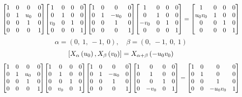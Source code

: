 \documentclass[11pt]{article}
\theoremstyle{definition}
\begin{document}
\[
\scaletoalign{\textwidth}{{\left[\begin{matrix}1 & 0 & 0 & 0\\0 & 1 & u_{0} & 0\\0 & 0 & 1 & 0\\0 & 0 & 0 & 1\end{matrix}\right]} {\left[\begin{matrix}1 & 0 & 0 & 0\\0 & 1 & 0 & 0\\v_{0} & 0 & 1 & 0\\0 & 0 & 0 & 1\end{matrix}\right]} {\left[\begin{matrix}1 & 0 & 0 & 0\\0 & 1 & - u_{0} & 0\\0 & 0 & 1 & 0\\0 & 0 & 0 & 1\end{matrix}\right]} {\left[\begin{matrix}1 & 0 & 0 & 0\\0 & 1 & 0 & 0\\- v_{0} & 0 & 1 & 0\\0 & 0 & 0 & 1\end{matrix}\right]} = {\left[\begin{matrix}1 & 0 & 0 & 0\\u_{0} v_{0} & 1 & 0 & 0\\0 & 0 & 1 & 0\\0 & 0 & 0 & 1\end{matrix}\right]}}
\]
\[
\alpha = \left( 0, \  1, \  -1, \  0\right), \quad \beta = \left( 0, \  -1, \  0, \  1\right)
\]
\[
\scaletoalign{\textwidth}{\left[ X_{\alpha}\left(u_{0}\right), X_{\beta}\left(v_{0}\right) \right] = X_{\alpha + \beta}\left(- u_{0} v_{0}\right)}
\]
\[
\scaletoalign{\textwidth}{{\left[\begin{matrix}1 & 0 & 0 & 0\\0 & 1 & u_{0} & 0\\0 & 0 & 1 & 0\\0 & 0 & 0 & 1\end{matrix}\right]} {\left[\begin{matrix}1 & 0 & 0 & 0\\0 & 1 & 0 & 0\\0 & 0 & 1 & 0\\0 & v_{0} & 0 & 1\end{matrix}\right]} {\left[\begin{matrix}1 & 0 & 0 & 0\\0 & 1 & - u_{0} & 0\\0 & 0 & 1 & 0\\0 & 0 & 0 & 1\end{matrix}\right]} {\left[\begin{matrix}1 & 0 & 0 & 0\\0 & 1 & 0 & 0\\0 & 0 & 1 & 0\\0 & - v_{0} & 0 & 1\end{matrix}\right]} = {\left[\begin{matrix}1 & 0 & 0 & 0\\0 & 1 & 0 & 0\\0 & 0 & 1 & 0\\0 & 0 & - u_{0} v_{0} & 1\end{matrix}\right]}}
\]
\end{document}
